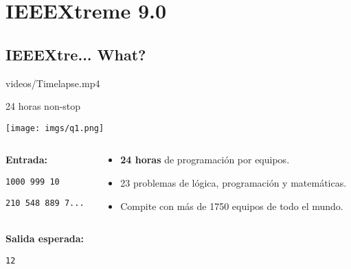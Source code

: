 
\section{IEEEXtreme 9.0}

\subsection{IEEEXtre... What?}
\begin{frame}
	       {videos/Timelapse.mp4}
\end{frame}

\begin{frame}{24 horas non-stop}
    \begin{center}
        \texttt{[image: imgs/q1.png]}
    \end{center}
    
    \begin{columns}
    \begin{column}{0.30\textwidth}
        \footnotesize
        \textbf{Entrada:}
        
        \texttt{1000 999 10}
        
        \texttt{210 548 889 7...} \\~
        
        \textbf{Salida esperada:}
        
        \texttt{12}
    \end{column}
    \begin{column}{0.80\textwidth}
        \begin{itemize}
            \small
            \item \textbf{24 horas} de programación por equipos.
            \item 23 problemas de lógica, programación y matemáticas.
            \item Compite con más de 1750 equipos de todo el mundo.
        \end{itemize}
    \end{column}
    \end{columns}
\end{frame}

